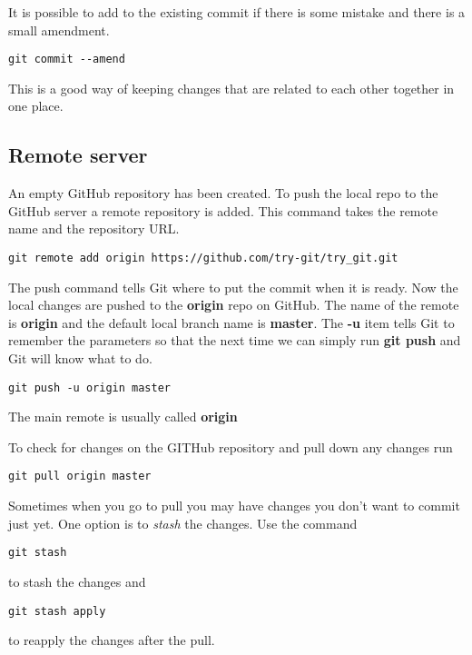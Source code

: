 \documentclass[11pt]{article} %
\begin{document}
It is possible to add to the existing commit if there is some mistake and there is a small amendment. 

\begin{lstlisting}
git commit --amend 
\end{lstlisting}

This is a good way of keeping changes that are related to each other together in one place. 

\subsection{Remote server}
An empty GitHub repository has been created.  To push the local repo to the GitHub server a remote repository is added.  This command takes the remote name and the repository URL.  

\begin{lstlisting}
git remote add origin https://github.com/try-git/try_git.git 
\end{lstlisting}

The push command tells Git where to put the commit when it is ready. Now the local changes are pushed to the \textbf{origin} repo on GitHub.  The name of the remote is \textbf{origin} and the default local branch name is \textbf{master}.  The \textbf{-u} item tells Git to remember the parameters so that the next time we can simply run \textbf{git push} and Git will know what to do. 

\begin{lstlisting}
git push -u origin master 
\end{lstlisting}

 
The main remote is usually called \textbf{origin}

To check for changes on the GITHub repository and pull down any changes run

\begin{lstlisting}
git pull origin master   
\end{lstlisting}

Sometimes when you go to pull you may have changes you don't want to commit just yet.  One option is to \emph{stash} the changes.  Use the command 

\begin{lstlisting}
git stash 
\end{lstlisting}
to stash the changes and 
\begin{lstlisting}
git stash apply  
\end{lstlisting}
to reapply the changes after the pull.
\end{document}
